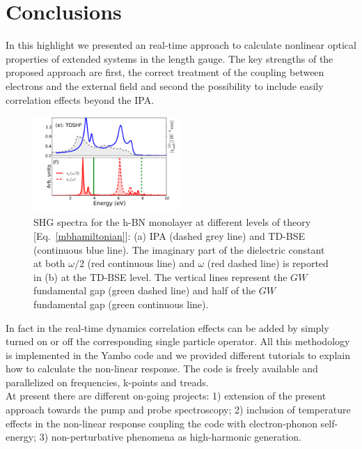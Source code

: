 \section{Conclusions}\label{conclusion}                                        
In this highlight we presented an \ai real-time approach to calculate nonlinear optical properties of extended systems in the length gauge. The key strengths of the proposed approach are first, the correct treatment of the coupling between electrons and the external field and second the possibility to include easily correlation effects beyond the IPA.  
\begin{figure}
    \centering
\includegraphics[width=0.5\textwidth]{Figures/eps_and_X2_short}
	\caption{\footnotesize{SHG spectra for the h-BN monolayer at different levels of theory [Eq.~\eqref{mbhamiltonian}]: (a) IPA (dashed grey line) and TD-BSE (continuous blue line). The imaginary part of the dielectric constant at both $\omega/2$ (red continuous line) and $\omega$ (red dashed line) is reported in (b) at the  TD-BSE level. The vertical lines represent the $GW$ fundamental gap (green dashed line) and half of the $GW$ fundamental gap (green continuous line). \label{X2bn} }}
\end{figure}
In fact in the real-time dynamics correlation effects can be added by simply turned on or off the corresponding single particle operator.  All this methodology is implemented in the Yambo code\cite{yambo} and we provided different tutorials to explain how to calculate the non-linear response.\cite{yambo_wiki} The code is freely available and parallelized on frequencies, k-points and treads. \\
At present there are different on-going projects: 1) extension of the present approach towards the pump and probe spectroscopy; 2) inclusion of temperature effects in the non-linear response coupling the code with electron-phonon self-energy; 3) non-perturbative phenomena as high-harmonic generation.

